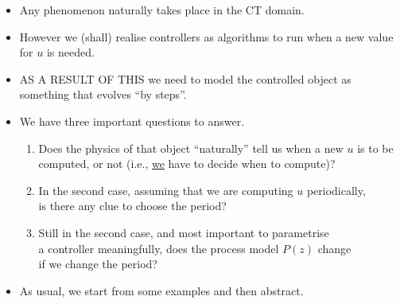 \begin{frame}
\framesubtitleTC{}
\myPause
 \begin{itemize}[<+-| alert@+>]
 \item Any phenomenon naturally takes place in the CT domain.
 \item However we (shall) realise controllers as algorithms to run when a new value for $u$ is needed.
 \item AS A RESULT OF THIS we need to model the controlled object as something that evolves ``by steps''.
 \item We have three important questions to answer.
       \begin{enumerate}[<+-| alert@+>]
       \item Does the physics of that object ``naturally'' tell us when a new $u$ is to be\\
             computed, or not (i.e., \underline{we} have to decide when to compute)?
       \item In the second case, assuming that we are computing $u$ periodically,\\
             is there any clue to choose the period?
       \item Still in the second case, and most important to parametrise\\
             a controller meaningfully, does the process model $P(z)$ change\\
             if we change the period?
       \end{enumerate}
 \item \vfill As usual, we start from some examples and then abstract.
 \end{itemize}
\end{frame}

